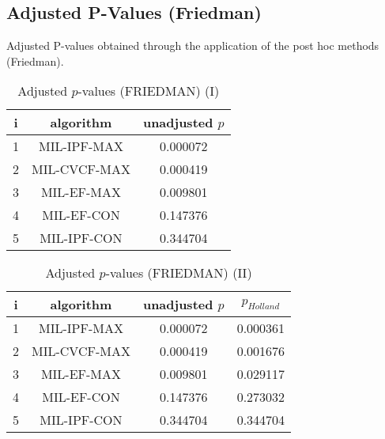 \documentclass[a4paper,10pt]{article}
\begin{document}
\begin{landscape}
\newpage

\section{Adjusted P-Values (Friedman)}


Adjusted P-values obtained through the application of the post hoc methods (Friedman).

\begin{table}[!htp]
\centering\small
\begin{tabular}{ccc}
i&algorithm&unadjusted $p$\\
\hline1&MIL-IPF-MAX&0.000072\\2&MIL-CVCF-MAX&0.000419\\3&MIL-EF-MAX&0.009801\\4&MIL-EF-CON&0.147376\\5&MIL-IPF-CON&0.344704\\\hline
\end{tabular}
\caption{Adjusted $p$-values (FRIEDMAN) (I)}
\end{table}
\begin{table}[!htp]
\centering\small
\begin{tabular}{cccc}
i&algorithm&unadjusted $p$&$p_{Holland}$\\
\hline1&MIL-IPF-MAX&0.000072&0.000361\\2&MIL-CVCF-MAX&0.000419&0.001676\\3&MIL-EF-MAX&0.009801&0.029117\\4&MIL-EF-CON&0.147376&0.273032\\5&MIL-IPF-CON&0.344704&0.344704\\\hline
\end{tabular}
\caption{Adjusted $p$-values (FRIEDMAN) (II)}
\end{table}

\newpage
\end{landscape}
\end{document}
